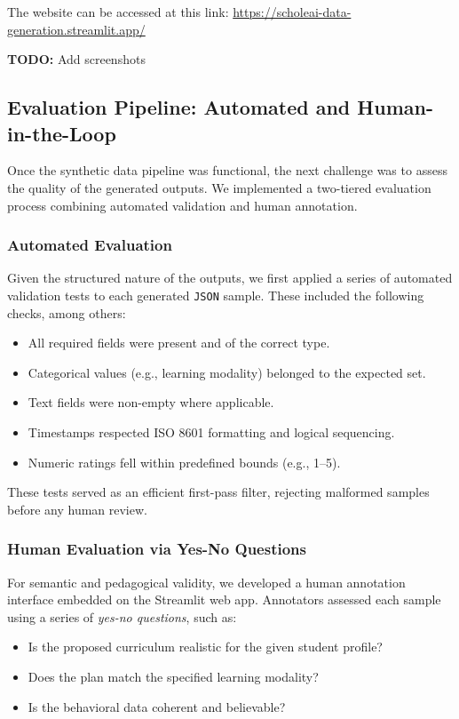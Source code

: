 \documentclass[sigconf]{acmart}
\begin{document}
The website can be accessed at this link: \href{https://scholeai-data-generation.streamlit.app/}{https://scholeai-data-generation.streamlit.app/}

\vspace{0.5cm}
\textbf{TODO:} Add screenshots

\subsection{Evaluation Pipeline: Automated and Human-in-the-Loop}

Once the synthetic data pipeline was functional, the next challenge was to assess the quality of the generated outputs. We implemented a two-tiered evaluation process combining automated validation and human annotation.

\subsubsection{Automated Evaluation}  
Given the structured nature of the outputs, we first applied a series of automated validation tests to each generated \texttt{JSON} sample. These included the following checks, among others:
\begin{itemize}
    \item All required fields were present and of the correct type.
    \item Categorical values (e.g., learning modality) belonged to the expected set.
    \item Text fields were non-empty where applicable.
    \item Timestamps respected ISO 8601 formatting and logical sequencing.
    \item Numeric ratings fell within predefined bounds (e.g., 1--5).
\end{itemize}

These tests served as an efficient first-pass filter, rejecting malformed samples before any human review.

\subsubsection{Human Evaluation via Yes-No Questions}  
For semantic and pedagogical validity, we developed a human annotation interface embedded on the Streamlit web app. Annotators assessed each sample using a series of \textit{yes-no questions}, such as:
\begin{itemize}
    \item Is the proposed curriculum realistic for the given student profile?
    \item Does the plan match the specified learning modality?
    \item Is the behavioral data coherent and believable?
\end{itemize}
\end{document}
